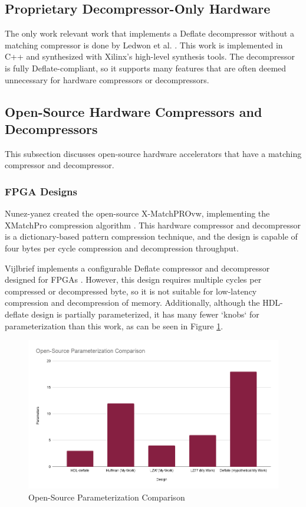 \documentclass[doublespace,nopageskip]{VTthesis}
\begin{document}
\subsection{Proprietary Decompressor-Only Hardware}\label{ss:proprietary_decompressor-only_hardware}
The only work relevant work that implements a Deflate decompressor without a matching compressor is done by Ledwon et al. \cite{deflatedecompression}. This work is implemented in C++ and synthesized with Xilinx's high-level synthesis tools. The decompressor is fully Deflate-compliant, so it supports many features that are often deemed unnecessary for hardware compressors or decompressors.

\subsection{Open-Source Hardware Compressors and Decompressors}\label{ss:open-source_hardware_compressors_and_decompressors}
This subsection discusses open-source hardware accelerators that have a matching compressor and decompressor.

\subsubsection{FPGA Designs}\label{sss:open_fpga_designs}
Nunez-yanez created the open-source X-MatchPROvw, implementing the XMatchPro compression algorithm \cite{xmatchpro}. This hardware compressor and decompressor is a dictionary-based pattern compression technique, and the design is capable of four bytes per cycle compression and decompression throughput.

Vijlbrief implements a configurable Deflate compressor and decompressor designed for FPGAs \cite{hdldeflate}. However, this design requires multiple cycles per compressed or decompressed byte, so it is not suitable for low-latency compression and decompression of memory. Additionally, although the HDL-deflate design is partially parameterized, it has many fewer `knobs` for parameterization than this work, as can be seen in Figure \ref{fig:open-source_parameterization_comparison}.

\begin{figure}[htb]
	\centering
	\includegraphics[scale=0.44]{Open-Source Parameterization Comparison.png}
	\caption{Open-Source Parameterization Comparison}
	\label{fig:open-source_parameterization_comparison}
\end{figure}
\end{document}
